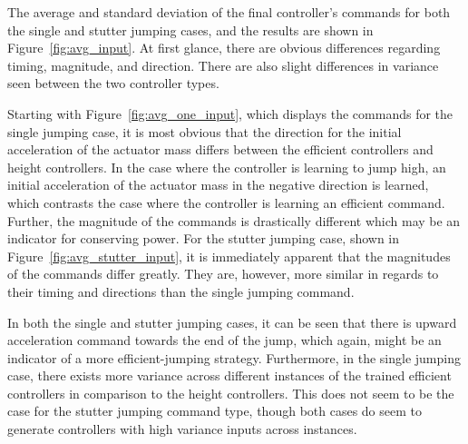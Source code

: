 The average and standard deviation of the final controller's commands for both the single and stutter jumping cases, and the results are shown in Figure~\ref{fig:avg_input}. At first glance, there are obvious differences regarding timing, magnitude, and direction. There are also slight differences in variance seen between the two controller types. 

Starting with Figure~\ref{fig:avg_one_input}, which displays the commands for the single jumping case, it is most obvious that the direction for the initial acceleration of the actuator mass differs between the efficient controllers and height controllers. In the case where the controller is learning to jump high, an initial acceleration of the actuator mass in the negative direction is learned, which contrasts the case where the controller is learning an efficient command. Further, the magnitude of the commands is drastically different which may be an indicator for conserving power. For the stutter jumping case, shown in Figure~\ref{fig:avg_stutter_input}, it is immediately apparent that the magnitudes of the commands differ greatly. They are, however, more similar in regards to their timing and directions than the single jumping command. 

In both the single and stutter jumping cases, it can be seen that there is upward acceleration command towards the end of the jump, which again, might be an indicator of a more efficient-jumping strategy. Furthermore, in the single jumping case, there exists more variance across different instances of the trained efficient controllers in comparison to the height controllers. This does not seem to be the case for the stutter jumping command type, though both cases do seem to generate controllers with high variance inputs across instances.
% 
